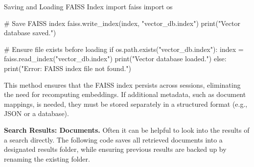 \begin{codeonly}{Saving and Loading FAISS Index}
import faiss
import os

# Save FAISS index
faiss.write_index(index, "vector_db.index")
print("Vector database saved.")

# Ensure file exists before loading
if os.path.exists("vector_db.index"):
    index = faiss.read_index("vector_db.index")
    print("Vector database loaded.")
else:
    print("Error: FAISS index file not found.")
\end{codeonly}

This method ensures that the FAISS index persists across sessions, eliminating the need for 
recomputing embeddings. If additional metadata, such as document mappings, is needed, 
they must be stored separately in a structured format (e.g., JSON or a database).

\bigskip
{\bf Search Results: Documents.}
Often it can be helpful to look into the results of a search directly. The following code saves all retrieved 
documents into a designated results folder, while ensuring previous results are backed up by renaming the 
existing folder.

